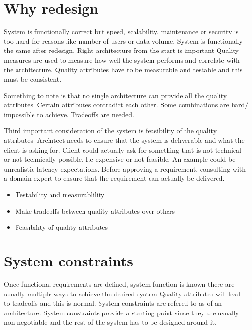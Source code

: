 \documentclass[a4paper, 11pt]{book}
\begin{document}
    \section{Why redesign}
    System is functionally correct but speed, scalability, maintenance or security is too hard for reasons like number of users or data volume.
    System is functionally the same after redesign.
    Right architecture from the start is important
    Quality measures are used to measure how well the system performs and correlate with the architecture.
    Quality attributes have to be measurable and testable and this must be consistent.

    Something to note is that no single architecture can provide all the quality attributes. Certain attributes contradict each other.
    Some combinations are hard/ impossible to achieve.
    Tradeoffs are needed.

    Third important consideration of the system is feasibility of the quality attributes.
    Architect needs to ensure that the system is deliverable and what the client is asking for.
    Client could actually ask for something that is not technical or not technically possible.
    I.e expensive or not feasible.
    An example could be unrealistic latency expectations.
    Before approving a requirement, consulting with a domain expert to ensure that the requirement can actually be delivered.

    \begin{itemize}
        \item Testability and measurablility
        \item Make tradeoffs between quality attributes over others
        \item Feasibility of quality attributes
    \end{itemize}


    \section{System constraints}
    Once functional requirements are defined, system function is known there are usually multiple ways to achieve the desired system
    Quality attributes will lead to tradeoffs and this is normal.
    System constraints are refered to as  of an architecture.
    System constraints provide a starting point since they are usually non-negotiable and the rest of the system has to be designed around it.
\end{document}
